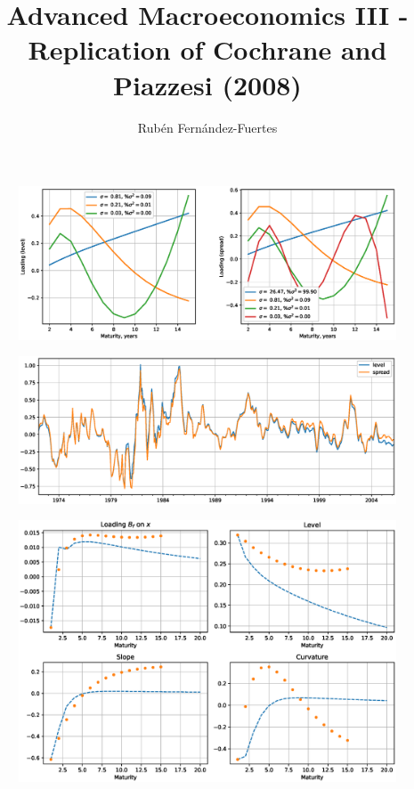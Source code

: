 \documentclass{amsart}
\title{Advanced Macroeconomics III - Replication of Cochrane and Piazzesi (2008)}
\author{Rubén Fernández-Fuertes}
\begin{document}
	\maketitle


	\begin{table}[h!]
		\centering
		
	\end{table}


	\begin{table}[h!]
		\centering
		
	\end{table}


	\begin{figure}[h!]
		\centering
		\includegraphics[scale=0.5]{fig/eps/Figure3.eps}
	\end{figure}

	\begin{figure}[h!]
		\centering
		\includegraphics[scale=0.5]{fig/eps/Figure4.eps}
	\end{figure}

	\begin{figure}[h!]
		\centering
		\includegraphics[scale=0.5]{fig/eps/Figure5.eps}
	\end{figure}
\end{document}
